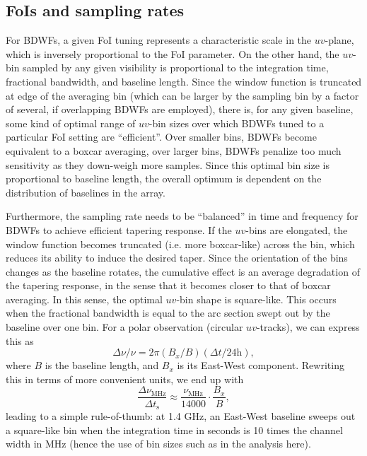 \documentclass[useAMS,usenatbib]{mn2e}
\begin{document}
\subsection{FoIs and sampling rates}

For BDWFs, a given FoI tuning represents a characteristic scale in the $uv$-plane, which is inversely proportional to the 
FoI parameter. On the other hand, the $uv$-bin sampled by any given visibility is proportional to the integration time,
fractional bandwidth, and baseline length. Since the window function is truncated at edge of the averaging bin (which can be
larger by the sampling bin by a factor of several, if overlapping BDWFs are employed), there is, for any given baseline,
some kind of optimal range of $uv$-bin sizes over which BDWFs tuned to a particular FoI setting are ``efficient''. Over 
smaller bins, BDWFs become equivalent to a boxcar averaging, over larger bins, BDWFs penalize too much
sensitivity as they down-weigh more samples. Since this optimal bin size is proportional to baseline length, the overall
optimum is dependent on the distribution of baselines in the array. 

Furthermore, the sampling rate needs to be ``balanced'' in time and frequency for BDWFs to achieve efficient tapering
response. If the $uv$-bins are elongated, the window function becomes truncated (i.e. more boxcar-like) across the bin, which reduces its ability 
to induce the desired taper. Since the orientation of the bins changes as the baseline rotates, the 
cumulative effect is an average degradation of the tapering response, in the
sense that it becomes closer to that of boxcar averaging. In this sense,
the optimal $uv$-bin shape is square-like. This occurs when the fractional bandwidth is equal to the arc section swept
out by the baseline over one bin. For a polar observation (circular $uv$-tracks), we can express this as
\begin{equation}
\Delta \nu/\nu = 2 \pi (B_x/B)(\Delta t/24\mathrm{h}),
\end{equation}
where $B$ is the baseline length, and $B_x$ is its East-West component. Rewriting this in terms of more convenient units,
we end up with 
\begin{equation}
\frac{\Delta \nu_\mathrm{MHz}}{\Delta t_\mathrm{s}} \approx \frac{\nu_\mathrm{MHz}}{14000} \cdot \frac{B_x}{B},
\label{eq:optimal-binsize} 
\end{equation}
leading to a simple rule-of-thumb: at 1.4 GHz, an East-West baseline sweeps out a square-like bin when the 
integration time in seconds is 10 times the channel width in MHz (hence the use of bin sizes such as  
in the analysis here). 
\end{document}
